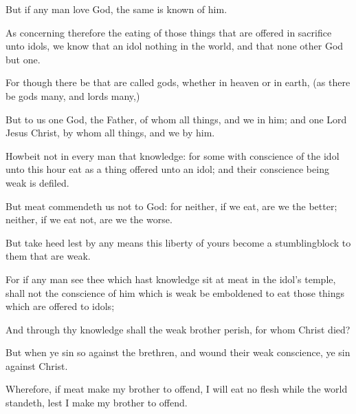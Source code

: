 {But
if any
man
love
God, the
same is
known
of
him.

As
concerning
therefore the
eating of those things that are offered in sacrifice unto
idols, we
know
that an
idol
{}
nothing
in the
world,
and
that
{}
none
other
God
but
one.

For
though there
be that are
called
gods,
whether
in
heaven
or
in
earth, (as there
be
gods
many,
and
lords
many,)

But to
us
{}
one
God, the
Father,
of
whom
{} all
things,
and
we
in
him;
and
one
Lord
Jesus
Christ,
by
whom
{} all
things,
and
we
by
him.

Howbeit
{}
not
in every
man that
knowledge:
for
some with
conscience of the
idol
unto this
hour
eat
{}
as a thing offered unto an
idol;
and
their
conscience
being
weak is
defiled.

But
meat
commendeth
us
not to
God:
for
neither,
if we
eat, are we the
better;
neither,
if we
eat
not, are we the
worse.

But take
heed lest by any
means
this
liberty of
yours
become a
stumblingblock to
them that are
weak.

For
if any
man
see
thee which
hast
knowledge sit at
meat
in the
idol’s temple,
shall
not the
conscience of
him which
is
weak be
emboldened to
eat those things which are offered to
idols;

And
through
thy
knowledge
shall the
weak
brother
perish,
for
whom
Christ
died?

But when ye
sin
so
against the
brethren,
and
wound
their
weak
conscience, ye
sin
against
Christ.

Wherefore,
if
meat
make
my
brother to
offend, I will
eat
no
flesh
while the world
standeth,
lest I
make
my
brother
to
offend.




\par }
